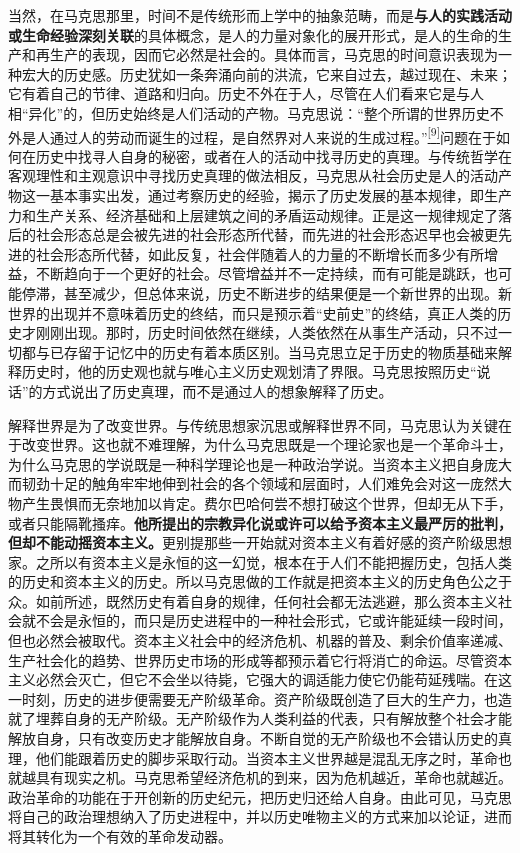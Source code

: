 \documentclass[UTF8, fontset = sourcesans, a4paper, oneside, zihao =
-4, scheme=chinese, no-math, space=true]{ctexbook}
\begin{document}
当然，在马克思那里，时间不是传统形而上学中的抽象范畴，而是\textbf{与人的实践活动或生命经验深刻关联}的具体概念，是人的力量对象化的展开形式，是人的生命的生产和再生产的表现，因而它必然是社会的。具体而言，马克思的时间意识表现为一种宏大的历史感。历史犹如一条奔涌向前的洪流，它来自过去，越过现在、未来；它有着自己的节律、道路和归向。历史不外在于人，尽管在人们看来它是与人相``异化''的，但历史始终是人们活动的产物。马克思说：``整个所谓的世界历史不外是人通过人的劳动而诞生的过程，是自然界对人来说的生成过程。''\protect\hypertarget{part0010_split_002.htmlux5cux23w9}{}{}\protect\hyperlink{part0010_split_002.htmlux5cux23m9}{\textsuperscript{{[}9{]}}}问题在于如何在历史中找寻人自身的秘密，或者在人的活动中找寻历史的真理。与传统哲学在客观理性和主观意识中寻找历史真理的做法相反，马克思从社会历史是人的活动产物这一基本事实出发，通过考察历史的经验，揭示了历史发展的基本规律，即生产力和生产关系、经济基础和上层建筑之间的矛盾运动规律。正是这一规律规定了落后的社会形态总是会被先进的社会形态所代替，而先进的社会形态迟早也会被更先进的社会形态所代替，如此反复，社会伴随着人的力量的不断增长而多少有所增益，不断趋向于一个更好的社会。尽管增益并不一定持续，而有可能是跳跃，也可能停滞，甚至减少，但总体来说，历史不断进步的结果便是一个新世界的出现。新世界的出现并不意味着历史的终结，而只是预示着``史前史''的终结，真正人类的历史才刚刚出现。那时，历史时间依然在继续，人类依然在从事生产活动，只不过一切都与已存留于记忆中的历史有着本质区别。当马克思立足于历史的物质基础来解释历史时，他的历史观也就与唯心主义历史观划清了界限。马克思按照历史``说话''的方式说出了历史真理，而不是通过人的想象解释了历史。

解释世界是为了改变世界。与传统思想家沉思或解释世界不同，马克思认为关键在于改变世界。这也就不难理解，为什么马克思既是一个理论家也是一个革命斗士，为什么马克思的学说既是一种科学理论也是一种政治学说。当资本主义把自身庞大而韧劲十足的触角牢牢地伸到社会的各个领域和层面时，人们难免会对这一庞然大物产生畏惧而无奈地加以肯定。费尔巴哈何尝不想打破这个世界，但却无从下手，或者只能隔靴搔痒。\textbf{他所提出的宗教异化说或许可以给予资本主义最严厉的批判，但却不能动摇资本主义。}更别提那些一开始就对资本主义有着好感的资产阶级思想家。之所以有资本主义是永恒的这一幻觉，根本在于人们不能把握历史，包括人类的历史和资本主义的历史。所以马克思做的工作就是把资本主义的历史角色公之于众。如前所述，既然历史有着自身的规律，任何社会都无法逃避，那么资本主义社会就不会是永恒的，而只是历史进程中的一种社会形式，它或许能延续一段时间，但也必然会被取代。资本主义社会中的经济危机、机器的普及、剩余价值率递减、生产社会化的趋势、世界历史市场的形成等都预示着它行将消亡的命运。尽管资本主义必然会灭亡，但它不会坐以待毙，它强大的调适能力使它仍能苟延残喘。在这一时刻，历史的进步便需要无产阶级革命。资产阶级既创造了巨大的生产力，也造就了埋葬自身的无产阶级。无产阶级作为人类利益的代表，只有解放整个社会才能解放自身，只有改变历史才能解放自身。不断自觉的无产阶级也不会错认历史的真理，他们能跟着历史的脚步采取行动。当资本主义世界越是混乱无序之时，革命也就越具有现实之机。马克思希望经济危机的到来，因为危机越近，革命也就越近。政治革命的功能在于开创新的历史纪元，把历史归还给人自身。由此可见，马克思将自己的政治理想纳入了历史进程中，并以历史唯物主义的方式来加以论证，进而将其转化为一个有效的革命发动器。
\end{document}
